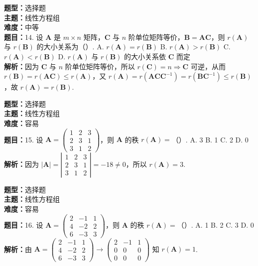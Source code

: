 \documentclass{ctexart}
\newenvironment{question}[5]{%
	\noindent\textbf{题型：}#1\\
	\textbf{主题：}#2\\
	\textbf{难度：}#3\\
	\textbf{题目：}#4\\
	\textbf{解析：}#5\\
	\vspace{1em}
}{}
\begin{document}
	\begin{question}
		{选择题}
		{线性方程组}
		{中等}
		{14. 设 \(\mathbf{A}\) 是 \(m \times n\) 矩阵，\(\mathbf{C}\) 与 \(n\) 阶单位矩阵等价，\(\mathbf{B}=\mathbf{A C}\)，则 \(r(\mathbf{A})\) 与 \(r(\mathbf{B})\) 的大小关系为（）. 
			A. \(r(\mathbf{A})=r(\mathbf{B})\)
			B. \(r(\mathbf{A})>r(\mathbf{B})\)
			C. \(r(\mathbf{A})<r(\mathbf{B})\)
			D. \(r(\mathbf{A})\) 与 \(r(\mathbf{B})\) 的大小关系依 \(\mathbf{C}\) 而定}
		{因为 \(\mathbf{C}\) 与 \(n\) 阶单位矩阵等价，所以 \(r(\mathbf{C})=n \Rightarrow \mathbf{C}\) 可逆，从而 \(r(\mathbf{B})=r(\mathbf{A C}) \leq r(\mathbf{A})\)，又 \(r(\mathbf{A})=r\left(\mathbf{A} \mathbf{C C}^{-1}\right)=r\left(\mathbf{B C}^{-1}\right) \leq r(\mathbf{B})\)，故 \(r(\mathbf{A})=r(\mathbf{B})\). }
	\end{question}
	
	\begin{question}
		{选择题}
		{线性方程组}
		{容易}
		{15. 设 \(\mathbf{A}=\left(\begin{array}{lll}1 & 2 & 3 \\ 2 & 3 & 1 \\ 3 & 1 & 2\end{array}\right)\)，则 \(\mathbf{A}\) 的秩 \(r(\mathbf{A})=\)（）. 
			A. 3
			B. 1
			C. 2
			D. 0}
		{因为 \(|\mathbf{A}|=\left|\begin{array}{lll}1 & 2 & 3 \\ 2 & 3 & 1 \\ 3 & 1 & 2\end{array}\right|=-18 \neq 0\)，所以 \(r(\mathbf{A})=3\). }
	\end{question}
	
	\begin{question}
		{选择题}
		{线性方程组}
		{容易}
		{16. 设 \(\mathbf{A}=\left(\begin{array}{lll}2 & -1 & 1 \\ 4 & -2 & 2 \\ 6 & -3 & 3\end{array}\right)\)，则 \(\mathbf{A}\) 的秩 \(r(\mathbf{A})=\)（）. 
			A. 1
			B. 2
			C. 3
			D. 0}
		{由 \(\mathbf{A}=\left(\begin{array}{ccc}2 & -1 & 1 \\ 4 & -2 & 2 \\ 6 & -3 & 3\end{array}\right) \rightarrow\left(\begin{array}{ccc}2 & -1 & 1 \\ 0 & 0 & 0 \\ 0 & 0 & 0\end{array}\right)\) 知 \(r(\mathbf{A})=1\). }
	\end{question}
	
\end{document}

